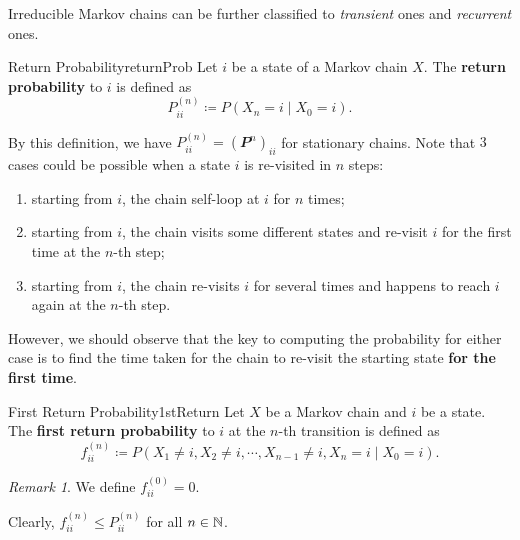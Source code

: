 \documentclass[math, code]{amznotes}
\theoremstyle{remark}
\newtheorem*{remark}{Remark}
\begin{document}
Irreducible Markov chains can be further classified to \textit{transient} ones and \textit{recurrent} ones.
\begin{dfnbox}{Return Probability}{returnProb}
    Let $i$ be a state of a Markov chain $X$. The {\color{red} \textbf{return probability}} to $i$ is defined as 
    \begin{equation*}
        P^{\left(n\right)}_{ii} \coloneqq P\left(X_n = i \mid X_0 = i\right).
    \end{equation*}
\end{dfnbox}
By this definition, we have $P^{\left(n\right)}_{ii} = \left(\mathbfit{P}^n\right)_{ii}$ for stationary chains. Note that $3$ cases could be possible when a state $i$ is re-visited in $n$ steps:
\begin{enumerate}
    \item starting from $i$, the chain self-loop at $i$ for $n$ times;
    \item starting from $i$, the chain visits some different states and re-visit $i$ for the first time at the $n$-th step;
    \item starting from $i$, the chain re-visits $i$ for several times and happens to reach $i$ again at the $n$-th step.
\end{enumerate}
However, we should observe that the key to computing the probability for either case is to find the time taken for the chain to re-visit the starting state \textbf{for the first time}.
\begin{dfnbox}{First Return Probability}{1stReturn}
    Let $X$ be a Markov chain and $i$ be a state. The {\color{red} \textbf{first return probability}} to $i$ at the $n$-th transition is defined as 
    \begin{equation*}
        f_{ii}^{\left(n\right)} \coloneqq P\left(X_1 \neq i, X_2 \neq i, \cdots, X_{n - 1} \neq i, X_n = i \mid X_0 = i\right).
    \end{equation*}
\end{dfnbox}
\begin{notebox}
    \begin{remark}
        We define $f^{\left(0\right)}_{ii} = 0$.
    \end{remark}
\end{notebox}
Clearly, $f_{ii}^{\left(n\right)} \leq P_{ii}^{\left(n\right)}$ for all $n \in \mathbb{N}$. 
\end{document}

